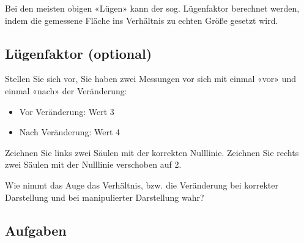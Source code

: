 Bei den meisten obigen «Lügen» kann der sog. Lügenfaktor berechnet werden, indem die gemessene Fläche ins Verhältnis zu echten Größe gesetzt wird.
\newpage
\subsection*{Lügenfaktor (optional)}
Stellen Sie sich vor, Sie haben zwei Messungen vor sich mit einmal «vor» und einmal «nach» der Veränderung:
\begin{itemize}
\item Vor Veränderung: Wert 3
\item Nach Veränderung: Wert 4
\end{itemize}

Zeichnen Sie links zwei Säulen mit der korrekten Nulllinie. Zeichnen Sie rechts zwei Säulen mit der Nulllinie verschoben auf 2.


Wie nimmt das Auge das Verhältnis, bzw. die Veränderung bei korrekter Darstellung und bei manipulierter Darstellung wahr?



\subsection*{Aufgaben}

\TNTeop{}{}


\newpage
